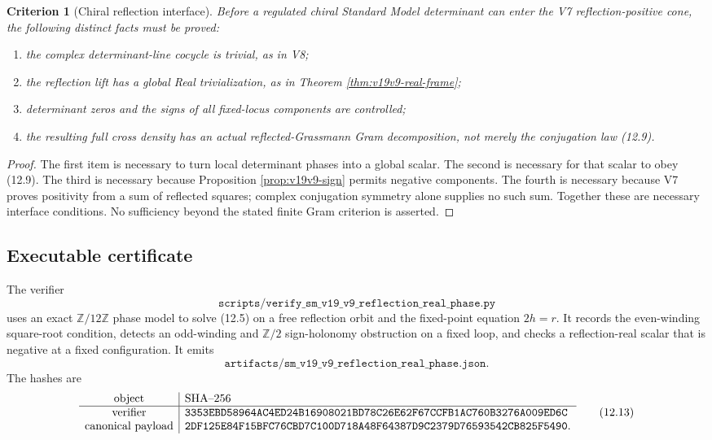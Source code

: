 \documentclass[11pt]{article}
\newtheorem{criterion}[theorem]{Criterion}
\theoremstyle{remark}
\begin{document}
\begin{criterion}[Chiral reflection interface]
\label{crit:v19v9-interface}
Before a regulated chiral Standard Model determinant can enter the V7
reflection-positive cone, the following distinct facts must be proved:
\begin{enumerate}
 \item the complex determinant-line cocycle is trivial, as in V8;
 \item the reflection lift has a global Real trivialization, as in
       Theorem \ref{thm:v19v9-real-frame};
 \item determinant zeros and the signs of all fixed-locus components are
       controlled;
 \item the resulting full cross density has an actual reflected-Grassmann
       Gram decomposition, not merely the conjugation law (12.9).
\end{enumerate}
\end{criterion}

\begin{proof}
The first item is necessary to turn local determinant phases into a global
scalar.  The second is necessary for that scalar to obey (12.9).  The third
is necessary because Proposition \ref{prop:v19v9-sign} permits negative
components.  The fourth is necessary because V7 proves positivity from a
sum of reflected squares; complex conjugation symmetry alone supplies no
such sum.  Together these are necessary interface conditions.  No
sufficiency beyond the stated finite Gram criterion is asserted.
\end{proof}

\subsection{Executable certificate}

The verifier
\[
 \texttt{scripts/verify\_sm\_v19\_v9\_reflection\_real\_phase.py}
                                                                  \tag{12.11}
\]
uses an exact \(\mathbb Z/12\mathbb Z\) phase model to solve (12.5) on a
free reflection orbit and the fixed-point equation \(2h=r\).  It records
the even-winding square-root condition, detects an odd-winding and
\(\mathbb Z/2\) sign-holonomy obstruction on a fixed loop, and checks a
reflection-real scalar that is negative at a fixed configuration.  It
emits
\[
 \texttt{artifacts/sm\_v19\_v9\_reflection\_real\_phase.json}. \tag{12.12}
\]
The hashes are
\[
\begin{array}{c|l}
\hbox{object}&\hbox{SHA--256}\\ \hline
\hbox{verifier}&
\texttt{3353EBD58964AC4ED24B16908021BD78C26E62F67CCFB1AC760B3276A009ED6C}\\
\hbox{canonical payload}&
\texttt{2DF125E84F15BFC76CBD7C100D718A48F64387D9C2379D76593542CB825F5490}.
\end{array}                                                     \tag{12.13}
\]
\end{document}
